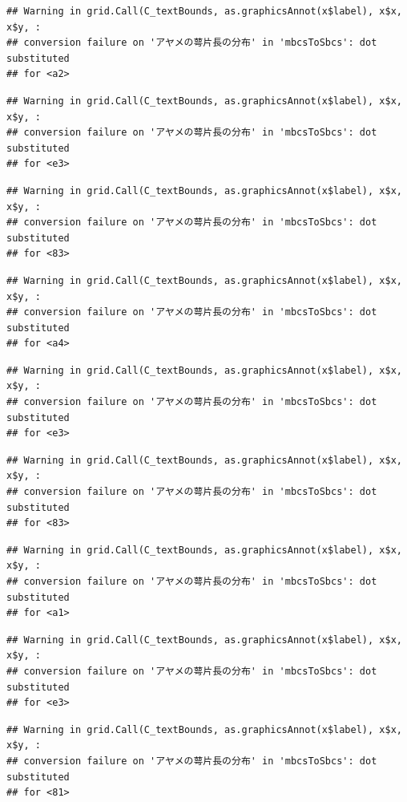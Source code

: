 \documentclass[
]{book}
\begin{document}
\begin{verbatim}
## Warning in grid.Call(C_textBounds, as.graphicsAnnot(x$label), x$x, x$y, :
## conversion failure on 'アヤメの萼片長の分布' in 'mbcsToSbcs': dot substituted
## for <a2>
\end{verbatim}

\begin{verbatim}
## Warning in grid.Call(C_textBounds, as.graphicsAnnot(x$label), x$x, x$y, :
## conversion failure on 'アヤメの萼片長の分布' in 'mbcsToSbcs': dot substituted
## for <e3>
\end{verbatim}

\begin{verbatim}
## Warning in grid.Call(C_textBounds, as.graphicsAnnot(x$label), x$x, x$y, :
## conversion failure on 'アヤメの萼片長の分布' in 'mbcsToSbcs': dot substituted
## for <83>
\end{verbatim}

\begin{verbatim}
## Warning in grid.Call(C_textBounds, as.graphicsAnnot(x$label), x$x, x$y, :
## conversion failure on 'アヤメの萼片長の分布' in 'mbcsToSbcs': dot substituted
## for <a4>
\end{verbatim}

\begin{verbatim}
## Warning in grid.Call(C_textBounds, as.graphicsAnnot(x$label), x$x, x$y, :
## conversion failure on 'アヤメの萼片長の分布' in 'mbcsToSbcs': dot substituted
## for <e3>
\end{verbatim}

\begin{verbatim}
## Warning in grid.Call(C_textBounds, as.graphicsAnnot(x$label), x$x, x$y, :
## conversion failure on 'アヤメの萼片長の分布' in 'mbcsToSbcs': dot substituted
## for <83>
\end{verbatim}

\begin{verbatim}
## Warning in grid.Call(C_textBounds, as.graphicsAnnot(x$label), x$x, x$y, :
## conversion failure on 'アヤメの萼片長の分布' in 'mbcsToSbcs': dot substituted
## for <a1>
\end{verbatim}

\begin{verbatim}
## Warning in grid.Call(C_textBounds, as.graphicsAnnot(x$label), x$x, x$y, :
## conversion failure on 'アヤメの萼片長の分布' in 'mbcsToSbcs': dot substituted
## for <e3>
\end{verbatim}

\begin{verbatim}
## Warning in grid.Call(C_textBounds, as.graphicsAnnot(x$label), x$x, x$y, :
## conversion failure on 'アヤメの萼片長の分布' in 'mbcsToSbcs': dot substituted
## for <81>
\end{verbatim}
\end{document}
